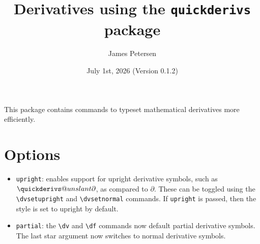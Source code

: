 \documentclass{article}
\title{Derivatives using the {\tt quickderivs} package}
\author{James Petersen}
\date{July 1st, 2026 (Version 0.1.2)}
\begin{document}
\maketitle

This package contains commands to typeset mathematical derivatives more
efficiently.

\section{Options}
\begin{itemize}
	\item \verb|upright|: enables support for upright derivative symbols,
		such as
		\makeatletter\(\quickderivs@unslant{\partial}\)\makeatother,
		as compared to \(\partial\). These can be toggled
		using the \verb|\dvsetupright| and \verb|\dvsetnormal| commands.
		If \verb|upright| is passed, then the style is set
		to upright by default.

	\item \verb|partial|: the \verb|\dv| and \verb|\df| commands now
		default partial derivative symbols. The last star argument
		now switches to normal derivative symbols.
\end{itemize}
\end{document}
